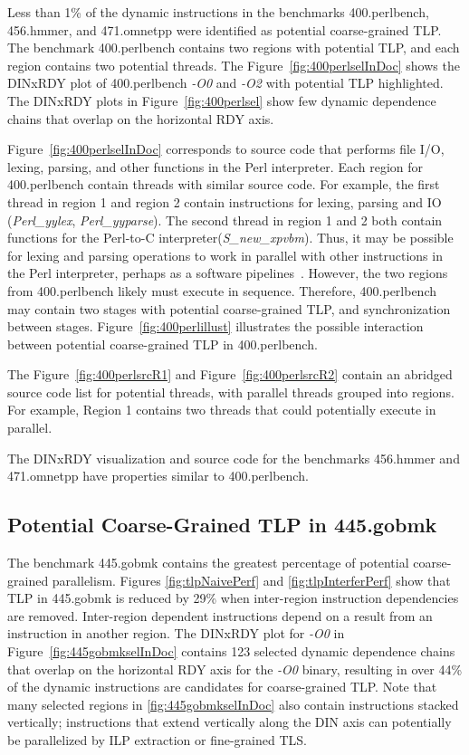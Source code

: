 {Less than 1\% of the dynamic instructions in the benchmarks 400.perlbench, 456.hmmer, and 471.omnetpp were identified as potential coarse-grained TLP.  The benchmark 400.perlbench contains two regions with potential TLP, and each region contains two potential threads. The Figure~\ref{fig:400perlselInDoc} shows the DINxRDY plot of 400.perlbench \textit{-O0} and \textit{-O2} with potential TLP highlighted.  The DINxRDY plots in Figure~\ref{fig:400perlsel} show few dynamic dependence chains that overlap on the horizontal RDY axis.

Figure~\ref{fig:400perlselInDoc} corresponds to source code that performs file I/O, lexing, parsing, and other functions in the Perl interpreter. Each region for 400.perlbench contain threads with similar source code.  For example, the first thread in region 1 and region 2 contain instructions for lexing, parsing and IO (\textit{Perl\_yylex}, \textit{Perl\_yyparse}).  The second thread in region 1 and 2 both contain functions for the Perl-to-C interpreter(\textit{S\_new\_xpvbm}). Thus, it may be possible for lexing and parsing operations to work in parallel with other instructions in the Perl interpreter, perhaps as a software pipelines~\cite{Allan:1995rt,giacomoni:08:ppopp}. However, the two regions from 400.perlbench likely must execute in sequence. Therefore, 400.perlbench may contain two stages with potential coarse-grained TLP, and synchronization between stages. Figure~\ref{fig:400perlillust} illustrates the possible interaction between potential coarse-grained TLP in 400.perlbench.

The Figure~\ref{fig:400perlsrcR1} and Figure~\ref{fig:400perlsrcR2} contain an abridged source code list for potential threads, with parallel threads grouped into regions.  For example, Region 1 contains two threads that could potentially execute in parallel.

The DINxRDY visualization and source code for the benchmarks 456.hmmer and 471.omnetpp have properties similar to 400.perlbench.

\subsection{Potential Coarse-Grained TLP in 445.gobmk}

The benchmark 445.gobmk contains the greatest percentage of potential coarse-grained parallelism. Figures \ref{fig:tlpNaivePerf} and \ref{fig:tlpInterferPerf} show that TLP in 445.gobmk is reduced by 29\% when inter-region instruction dependencies are removed. Inter-region dependent instructions depend on a result from an instruction in another region.  The DINxRDY plot for \textit{-O0} in Figure~\ref{fig:445gobmkselInDoc} contains 123 selected dynamic dependence chains that overlap on the horizontal RDY axis for the \textit{-O0} binary, resulting in over 44\% of the dynamic instructions are candidates for coarse-grained TLP.  Note that many selected regions in \ref{fig:445gobmkselInDoc} also contain instructions stacked vertically; instructions that extend vertically along the DIN axis can potentially be parallelized by ILP extraction or fine-grained TLS.

}

